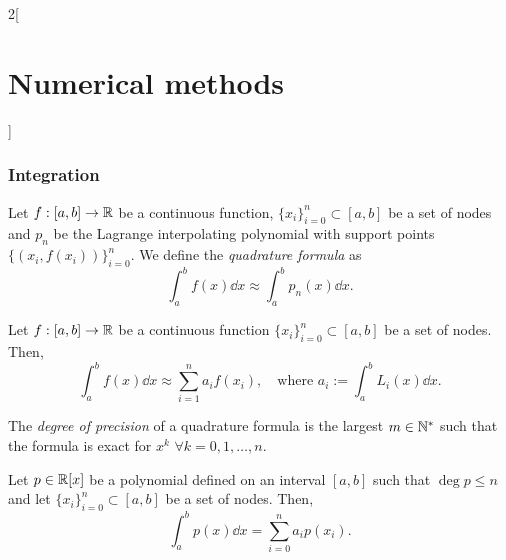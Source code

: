\documentclass[../../../main.tex]{subfiles}
\begin{document}
\begin{multicols}{2}[\section{Numerical methods}]
\subsubsection*{Integration}
\begin{definition}
    Let $f:[a,b]\rightarrow\mathbb{R}$ be a continuous function, $\{x_i\}_{i=0}^n\subset[a,b]$ be a set of nodes and $p_n$ be the Lagrange interpolating polynomial with support points $\{(x_i,f(x_i))\}_{i=0}^n$. We define the \textit{quadrature formula} as 
    \begin{equation}
        \int_a^bf(x)\dd x\approx\int_a^bp_n(x)\dd x.
        \label{NM-integration}
    \end{equation}
\end{definition}
\begin{lemma}
    Let $f:[a,b]\rightarrow\mathbb{R}$ be a continuous function $\{x_i\}_{i=0}^n\subset[a,b]$ be a set of nodes. Then, $$\int_a^bf(x)\dd x\approx\sum_{i=1}^na_if(x_i),\quad\text{where }a_i:=\int_a^bL_i(x)\dd x.$$
\end{lemma}
\begin{definition}
    The \textit{degree of precision} of a quadrature formula is the largest $m\in\mathbb{N}^*$ such that the formula is exact for $x^k$ $\forall k=0,1,\ldots,n$.
\end{definition}
\begin{lemma}
    Let $p\in\mathbb{R}[x]$ be a polynomial defined on an interval $[a,b]$ such that $\deg p\leq n$ and let $\{x_i\}_{i=0}^n\subset[a,b]$ be a set of nodes. Then, $$\int_a^bp(x)\dd x=\sum_{i=0}^na_ip(x_i).$$
\end{lemma}

\end{multicols}
\end{document}
